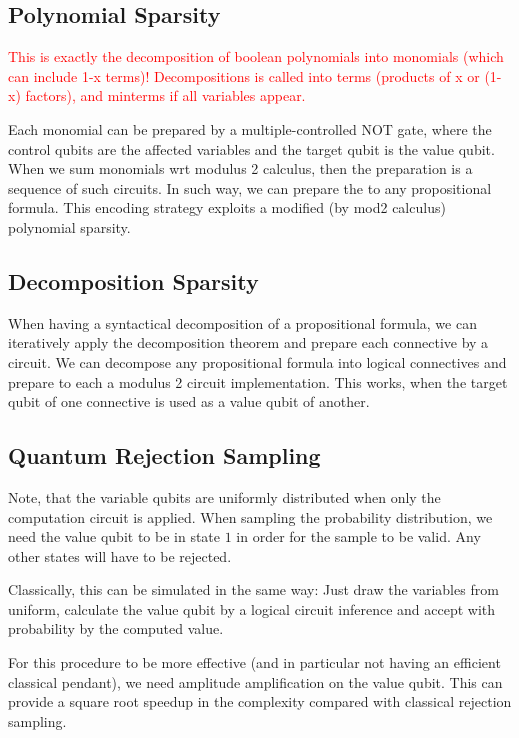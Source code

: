 \documentclass[aps,onecolumn,nofootinbib,pra]{article}
\newcommand{\red}[1]{\textcolor{red}{#1}}
\begin{document}
    \subsection{Polynomial Sparsity}

    \red{This is exactly the decomposition of boolean polynomials into monomials (which can include 1-x terms)!
    Decompositions is called into terms (products of x or (1-x) factors), and minterms if all variables appear.}

    Each monomial can be prepared by a multiple-controlled NOT gate, where the control qubits are the affected variables and the target qubit is the value qubit.
    When we sum monomials wrt modulus 2 calculus, then the preparation is a sequence of such circuits.
    In such way, we can prepare the \computationCircuit{} to any propositional formula.
    This encoding strategy exploits a modified (by mod2 calculus) polynomial sparsity.

    \subsection{Decomposition Sparsity}

    When having a syntactical decomposition of a propositional formula, we can iteratively apply the \computationCircuit{} decomposition theorem and prepare each connective by a circuit.
    We can decompose any propositional formula into logical connectives and prepare to each a modulus 2 circuit implementation.
    This works, when the target qubit of one connective is used as a value qubit of another.

    \subsection{Quantum Rejection Sampling}

    Note, that the variable qubits are uniformly distributed when only the computation circuit is applied.
    When sampling the probability distribution, we need the value qubit to be in state $1$ in order for the sample to be valid.
    Any other states will have to be rejected.

    Classically, this can be simulated in the same way: Just draw the variables from uniform, calculate the value qubit by a logical circuit inference and accept with probability by the computed value.

    For this procedure to be more effective (and in particular not having an efficient classical pendant), we need amplitude amplification on the value qubit.
    This can provide a square root speedup in the complexity compared with classical rejection sampling.
\end{document}
